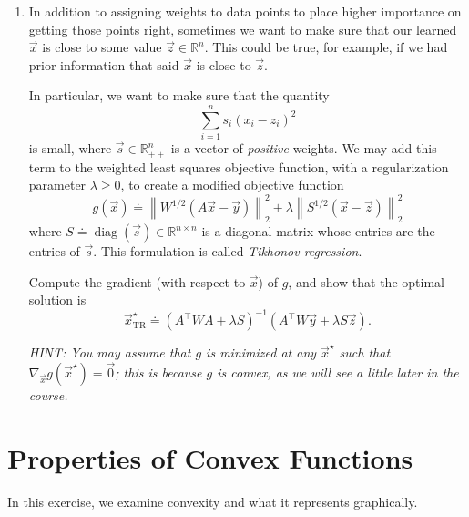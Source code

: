 \documentclass[10pt]{article}
\newcommand{\RR}{\mathbb{R}}
\begin{document}
\begin{enumerate}[label=(\alph*)]
    \emph{Note: Refer to Sec.~4.5 of the course reader for a discussion on MLE.}

    \item In addition to assigning weights to data points to place higher importance on getting those points right, sometimes we want to make sure that our learned $\vec{x}$ is close to some value $\vec{z} \in \RR^n$. This could be true, for example, if we had prior information that said $\vec{x}$ is close to $\vec{z}$.

    In particular, we want to make sure that the quantity
    \begin{equation}
        \sum_{i=1}^{n} s_i (x_i - z_i)^2
    \end{equation}
    is small, where $\vec{s} \in \RR^n_{++}$ is a vector of \emph{positive} weights. We may add this term to the weighted least squares objective function, with a regularization parameter $\lambda \geq 0$, to create a modified objective function
    \begin{equation}
        g(\vec{x}) \doteq \left\| W^{1/2}(A\vec{x} - \vec{y}) \right\|_2^2 + \lambda \left\| S^{1/2}(\vec{x} - \vec{z}) \right\|_2^2
    \end{equation}
    where $S \doteq \operatorname{diag}(\vec{s}) \in \RR^{n \times n}$ is a diagonal matrix whose entries are the entries of $\vec{s}$. This formulation is called \emph{Tikhonov regression}.

    Compute the gradient (with respect to $\vec{x}$) of $g$, and show that the optimal solution is
    \begin{equation}
        \vec{x}^\star_{\mathrm{TR}} \doteq (A^\top W A + \lambda S)^{-1}(A^\top W \vec{y} + \lambda S \vec{z}).
    \end{equation}

    \emph{HINT: You may assume that $g$ is minimized at any $\vec{x}^\star$ such that $\nabla_{\vec{x}} g(\vec{x}^\star) = \vec{0}$; this is because $g$ is convex, as we will see a little later in the course.}
\end{enumerate}

\section{Properties of Convex Functions}

In this exercise, we examine convexity and what it represents graphically.
\end{document}
